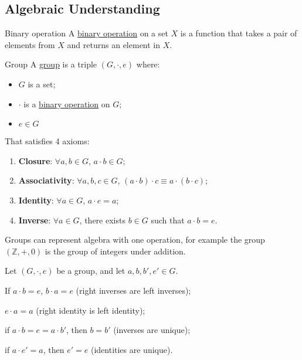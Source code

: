 \documentclass[../Main.tex]{subfiles}
\begin{document}
\subsection{Algebraic Understanding}
\begin{definition}{Binary operation} 
    A \underline{binary operation} on a set $X$ is a function that takes a pair of elements from $X$ and returns an element in $X$.
    \label{defBinaryOperation}
\end{definition}
\begin{definition}{Group}
    A \underline{group} is a triple $(G, \cdot, e)$ where:
    \begin{itemize}
        \item $G$ is a set;
        \item $\cdot$ is a \hyperref[defBinaryOperation]{binary operation} on $G$;
        \item $e \in G$
    \end{itemize}
    That satisfies 4 axioms:
    \begin{enumerate}
        \item \textbf{Closure}: $\forall a, b \in G$, $a \cdot b \in G$; \label{grpAxiomClosure}
        \item \textbf{Associativity}: $\forall a, b, c \in G$, $(a \cdot b)\cdot c \equiv a \cdot (b \cdot c)$; \label{grpAxiomAssoc}
        \item \textbf{Identity}: $\forall a \in G$, $a \cdot e = a$; \label{grpAxiomIdentity}
        \item \textbf{Inverse}: $\forall a \in G$, there exists $b \in G$ such that $a \cdot b = e$. \label{grpAxiomInverse}
    \end{enumerate}
\end{definition}
Groups can represent algebra with one operation, for example the group $(\mathbb{Z},+, 0)$ is the group of integers under addition.
\begin{propositions}{
        \label{propFundamentals}
        Let $(G, \cdot, e)$ be a group, and let $a, b, b', e' \in G$.
    }
    \item If $a \cdot b = e$, $b \cdot a = e$ (right inverses are left inverses);
    \item $e \cdot a = a$ (right identity is left identity);
    \item if $a \cdot b = e = a \cdot b'$, then $b = b'$ (inverses are unique);
    \item if $a \cdot e' = a$, then $e' = e$ (identities are unique).
\end{propositions}
\end{document}
